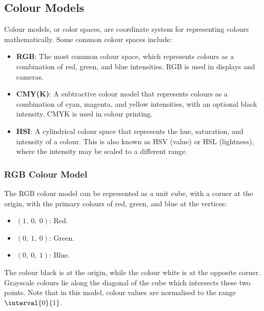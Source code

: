 \documentclass{article}
\begin{document}
\subsection{Colour Models}
Colour models, or color spaces, are coordinate system for representing
colours mathematically. Some common colour spaces include:
\begin{itemize}
    \item \textbf{RGB}: The most common colour space, which represents
          colours as a combination of red, green, and blue intensities.
          RGB is used in displays and cameras.
    \item \textbf{CMY(K)}: A subtractive colour model that represents
          colours as a combination of cyan, magenta, and yellow
          intensities, with an optional black intensity.
          CMYK is used in colour printing.
    \item \textbf{HSI}: A cylindrical colour space that represents
          the hue, saturation, and intensity of a colour. This is also known
          as HSV (value) or HSL (lightness), where the intensity may be scaled
          to a different range.
\end{itemize}
\subsubsection{RGB Colour Model}
The RGB colour model can be represented as a unit cube, with a corner
at the origin, with the primary colours of red, green, and blue at the
vertices:
\begin{itemize}
    \item \(\left( 1,\: 0,\: 0 \right)\): Red.
    \item \(\left( 0,\: 1,\: 0 \right)\): Green.
    \item \(\left( 0,\: 0,\: 1 \right)\): Blue.
\end{itemize}
The colour black is at the origin, while the colour white is at the
opposite corner. Grayscale colours lie along the diagonal of the cube
which intersects these two points. Note that in this model, colour
values are normalised to the range \(\interval{0}{1}\).
\end{document}
